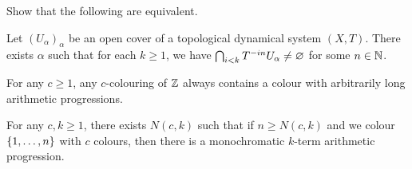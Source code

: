 \documentclass[reqno, twoside]{article}
\begin{document}
    \begin{exercise}
        Show that the following are equivalent.
        \begin{center}
            \begin{minipage}{0.95\textwidth}
                \begin{theorem*}
                    Let $(U_\alpha)_\alpha$ be an open cover of a topological dynamical system $(X,T)$. There exists $\alpha$ such that for each $k\geq1$, we have $\bigcap_{i<k}T^{-in}U_\alpha\neq\varnothing$ for some $n\in\mathbb{N}$.
                \end{theorem*}
                \begin{theorem*}
                    For any $c\geq1$, any $c$-colouring of $\mathbb{Z}$ always contains a colour with arbitrarily long arithmetic progressions.
                \end{theorem*}
                \begin{theorem*}
                    For any $c,k\geq1$, there exists $N(c,k)$ such that if $n\geq N(c,k)$ and we colour $\left\{1,\dots,n\right\}$ with $c$ colours, then there is a monochromatic $k$-term arithmetic progression.
                \end{theorem*}
            \end{minipage}
        \end{center}
    \end{exercise}
\end{document}
